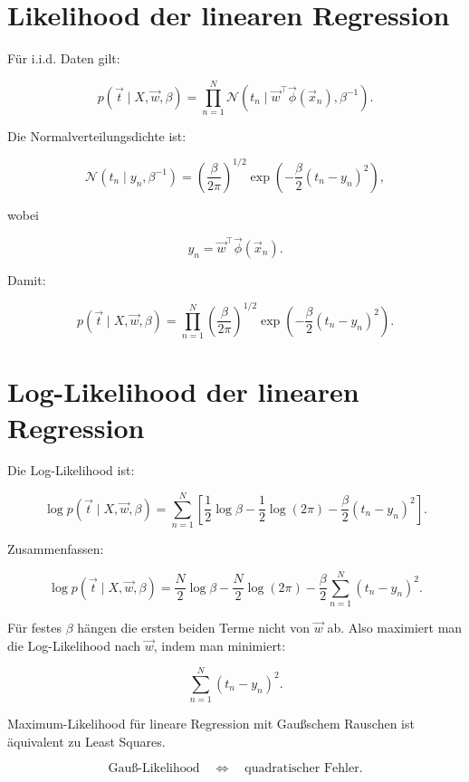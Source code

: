 \section{Likelihood der linearen Regression}

Für i.i.d. Daten gilt:

\[
    p(\vec{t} \mid X,\vec{w},\beta)
    =
    \prod_{n=1}^{N}
    \mathcal{N}
    \left(
        t_n
        \mid
        \vec{w}^{\top}\vec{\phi}(\vec{x}_n),
        \beta^{-1}
    \right).
\]

Die Normalverteilungsdichte ist:

\[
    \mathcal{N}
    \left(
        t_n
        \mid
        y_n,
        \beta^{-1}
    \right)
    =
    \left(
        \frac{\beta}{2\pi}
    \right)^{1/2}
    \exp\left(
        -\frac{\beta}{2}
        (t_n-y_n)^2
    \right),
\]

wobei

\[
    y_n
    =
    \vec{w}^{\top}\vec{\phi}(\vec{x}_n).
\]

Damit:

\[
    p(\vec{t} \mid X,\vec{w},\beta)
    =
    \prod_{n=1}^{N}
    \left(
        \frac{\beta}{2\pi}
    \right)^{1/2}
    \exp\left(
        -\frac{\beta}{2}
        (t_n-y_n)^2
    \right).
\]

\section{Log-Likelihood der linearen Regression}

Die Log-Likelihood ist:

\[
    \log p(\vec{t} \mid X,\vec{w},\beta)
    =
    \sum_{n=1}^{N}
    \left[
        \frac{1}{2}\log\beta
        -
        \frac{1}{2}\log(2\pi)
        -
        \frac{\beta}{2}
        (t_n-y_n)^2
    \right].
\]

Zusammenfassen:

\[
    \log p(\vec{t} \mid X,\vec{w},\beta)
    =
    \frac{N}{2}\log\beta
    -
    \frac{N}{2}\log(2\pi)
    -
    \frac{\beta}{2}
    \sum_{n=1}^{N}
    (t_n-y_n)^2.
\]

Für festes \(\beta\) hängen die ersten beiden Terme nicht von \(\vec{w}\) ab.
Also maximiert man die Log-Likelihood nach \(\vec{w}\), indem man minimiert:

\[
    \sum_{n=1}^{N}
    (t_n-y_n)^2.
\]

\begin{conceptbox}
Maximum-Likelihood für lineare Regression mit Gaußschem Rauschen ist äquivalent zu Least Squares.

\[
    \text{Gauß-Likelihood}
    \quad
    \Longleftrightarrow
    \quad
    \text{quadratischer Fehler}.
\]
\end{conceptbox}


